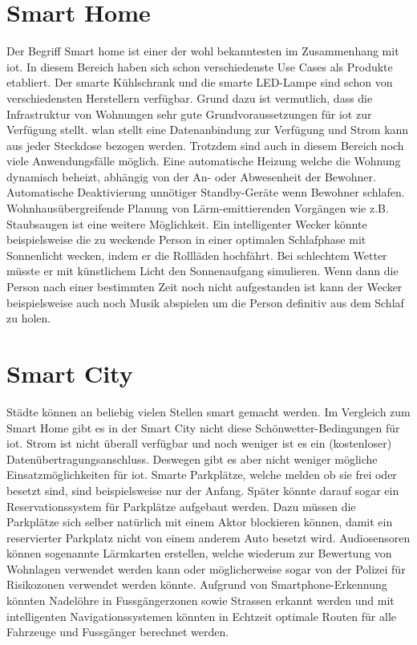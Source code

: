 \section{Smart Home}
Der Begriff \glqq{}Smart home\grqq{} ist einer der wohl bekanntesten im Zusammenhang mit \gls{iot}. In diesem Bereich haben sich schon verschiedenste Use Cases als Produkte etabliert. Der smarte Kühlschrank und die smarte LED-Lampe sind schon von verschiedensten Herstellern verfügbar. Grund dazu ist vermutlich, dass die Infrastruktur von Wohnungen sehr gute Grundvoraussetzungen für \gls{iot} zur Verfügung stellt. \gls{wlan} stellt eine Datenanbindung zur Verfügung und Strom kann aus jeder Steckdose bezogen werden. Trotzdem sind auch in diesem Bereich noch viele Anwendungsfälle möglich. Eine automatische Heizung welche die Wohnung dynamisch beheizt, abhängig von der An- oder Abwesenheit der Bewohner. Automatische Deaktivierung unnötiger Standby-Geräte wenn Bewohner schlafen. Wohnhausübergreifende Planung von Lärm-emittierenden Vorgängen wie z.B. Staubsaugen ist eine weitere Möglichkeit. Ein intelligenter Wecker könnte beispielsweise die zu weckende Person in einer optimalen Schlafphase mit Sonnenlicht wecken, indem er die Rollläden hochfährt. Bei schlechtem Wetter müsste er mit künstlichem Licht den Sonnenaufgang simulieren. Wenn dann die Person nach einer bestimmten Zeit noch nicht aufgestanden ist kann der Wecker beispielsweise auch noch Musik abspielen um die Person definitiv aus dem Schlaf zu holen.

\section{Smart City}
Städte können an beliebig vielen Stellen \glqq{}smart\grqq{} gemacht werden. Im Vergleich zum Smart Home gibt es in der Smart City nicht diese Schönwetter-Bedingungen für \gls{iot}. Strom ist nicht überall verfügbar und noch weniger ist es ein (kostenloser) Datenübertragungsanschluss. Deswegen gibt es aber nicht weniger mögliche Einsatzmöglichkeiten für \gls{iot}. Smarte Parkplätze, welche melden ob sie frei oder besetzt sind, sind beispielsweise nur der Anfang. Später könnte darauf sogar ein Reservationssystem für Parkplätze aufgebaut werden. Dazu müssen die Parkplätze sich selber natürlich mit einem Aktor blockieren können, damit ein reservierter Parkplatz nicht von einem anderem Auto besetzt wird. Audiosensoren können sogenannte Lärmkarten erstellen, welche wiederum zur Bewertung von Wohnlagen verwendet werden kann oder möglicherweise sogar von der Polizei für Risikozonen verwendet werden könnte. Aufgrund von Smartphone-Erkennung könnten Nadelöhre in Fussgängerzonen sowie Strassen erkannt werden und mit intelligenten Navigationssystemen könnten in Echtzeit optimale Routen für alle Fahrzeuge und Fussgänger berechnet werden.
\iffalse
